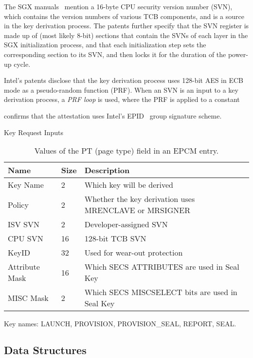 The SGX manuals~\cite{intel2013sgxmanual, intel2014sgx2manual} mention a
16-byte CPU security version number (SVN), which contains the version numbers
of various TCB components, and is a source in the key derivation process. The
patents further specify that the SVN register is made up of (most likely 8-bit)
sections that contain the SVNs of each layer in the SGX initialization process,
and that each initialization step sets the corresponding section to its SVN,
and then locks it for the duration of the power-up cycle.

Intel's patents disclose that the key derivation process uses 128-bit AES in
ECB mode as a pseudo-random function (PRF). When an SVN is an input to a key
derivation process, a \textit{PRF loop} is used, where the PRF is applied to
a constant



\cite{anati2013sgx} confirms that the attestation uses Intel's
EPID~\cite{brickell2009epid} group signature scheme.


Key Request Inputs

\begin{table}[hbt]
  \centering
  \begin{tabularx}{\columnwidth}{| l | l | X |}
  \hline
  \textbf{Name} & \textbf{Size} & \textbf{Description}\\
  \hline
  Key Name & 2 & Which key will be derived \\
  \hline
  Policy & 2 & Whether the key derivation uses MRENCLAVE or MRSIGNER \\
  \hline
  ISV SVN & 2 & Developer-assigned SVN \\
  \hline
  CPU SVN & 16 & 128-bit TCB SVN \\
  \hline
  KeyID & 32 & Used for wear-out protection \\
  \hline
  Attribute Mask & 16 & Which SECS ATTRIBUTES are used in Seal Key \\
  \hline
  MISC Mask & 2 & Which SECS MISCSELECT bits are used in Seal Key \\
  \hline
  \end{tabularx}
  \caption{Values of the PT (page type) field in an EPCM entry.}
  \label{fig:key_request_inputs}
\end{table}

Key names: LAUNCH, PROVISION, PROVISION\_SEAL, REPORT, SEAL.


\subsection{Data Structures}

